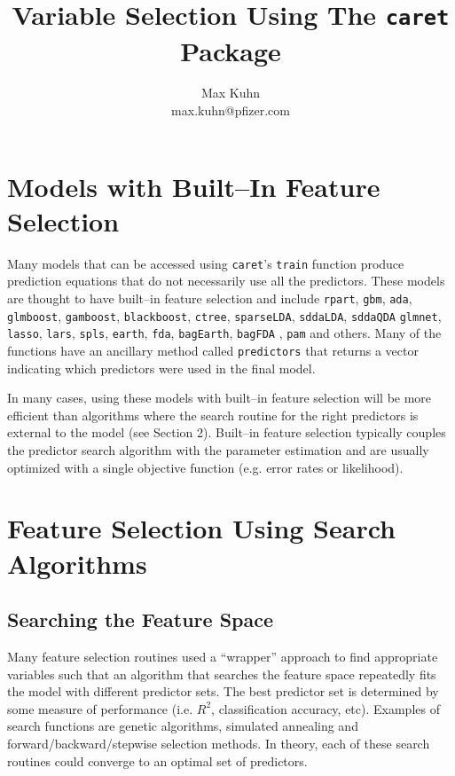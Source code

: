 \documentclass[12pt]{article}
\title{Variable Selection Using The {\tt caret} Package}
\author{Max Kuhn \\ max.kuhn@pfizer.com}
\begin{document}
\maketitle

\thispagestyle{empty}

\section{Models with Built--In Feature Selection}

Many models that can be accessed using \texttt{caret}'s \texttt{train} function produce prediction equations that do not necessarily use all the predictors. These models are thought to have built--in feature selection and include \texttt{rpart}, \texttt{gbm}, \texttt{ada}, \texttt{glmboost}, \texttt{gamboost}, \texttt{blackboost}, \texttt{ctree}, \texttt{sparseLDA}, \texttt{sddaLDA}, \texttt{sddaQDA}	\texttt{glmnet}, \texttt{lasso}, \texttt{lars}, \texttt{spls}, \texttt{earth}, \texttt{fda},   \texttt{bagEarth}, \texttt{bagFDA} , \texttt{pam} and others. Many of the functions have an ancillary method called \texttt{predictors} that returns a vector indicating which predictors were used in the final model.

In many cases, using these models with built--in feature selection will be more efficient than algorithms where the search routine for the right predictors is external to the model (see Section 2). Built--in feature selection typically couples the predictor search algorithm with the parameter  estimation and are usually optimized with a single objective function (e.g. error rates or likelihood). 


\section{Feature Selection Using Search Algorithms}

\subsection{Searching the Feature Space}

Many feature selection routines used a ``wrapper'' approach to find appropriate variables such that an algorithm that searches the feature space repeatedly fits the model with different predictor sets. The best predictor set is determined by some measure of performance (i.e. $R^2$, classification accuracy, etc). Examples of search functions are genetic algorithms, simulated annealing and forward/backward/stepwise selection methods. In theory, each of these search routines could converge to an optimal set of predictors.
\end{document}
